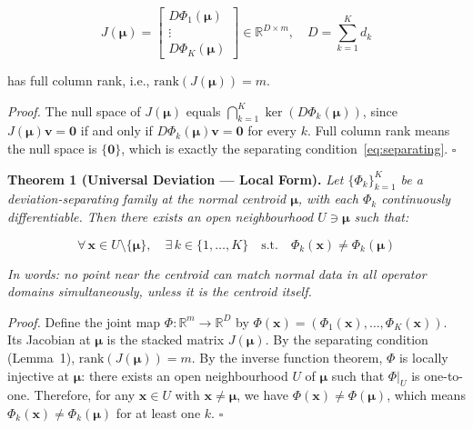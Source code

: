\documentclass[journal]{IEEEtran}
\newcommand{\R}{\mathbb{R}}
\begin{document}
\begin{equation}
J(\boldsymbol{\mu}) = \begin{bmatrix} D\Phi_1(\boldsymbol{\mu}) \\ \vdots \\ D\Phi_K(\boldsymbol{\mu}) \end{bmatrix} \in \R^{D \times m}, \quad D = \textstyle\sum_{k=1}^K d_k
\label{eq:stacked_jacobian}
\end{equation}

has full column rank, i.e., $\text{rank}(J(\boldsymbol{\mu})) = m$.

\textit{Proof.} The null space of $J(\boldsymbol{\mu})$ equals $\bigcap_{k=1}^K \ker(D\Phi_k(\boldsymbol{\mu}))$, since $J(\boldsymbol{\mu})\mathbf{v} = \mathbf{0}$ if and only if $D\Phi_k(\boldsymbol{\mu})\mathbf{v} = \mathbf{0}$ for every $k$. Full column rank means the null space is $\{\mathbf{0}\}$, which is exactly the separating condition~\eqref{eq:separating}. $\square$

\vspace{0.5em}

\textbf{Theorem 1 (Universal Deviation --- Local Form).} \textit{Let $\{\Phi_k\}_{k=1}^K$ be a deviation-separating family at the normal centroid $\boldsymbol{\mu}$, with each $\Phi_k$ continuously differentiable. Then there exists an open neighbourhood $U \ni \boldsymbol{\mu}$ such that:}

\begin{equation}
\forall\, \mathbf{x} \in U \setminus \{\boldsymbol{\mu}\},\quad \exists\, k \in \{1,\ldots,K\} \quad\text{s.t.}\quad \Phi_k(\mathbf{x}) \neq \Phi_k(\boldsymbol{\mu})
\label{eq:theorem_local}
\end{equation}

\textit{In words: no point near the centroid can match normal data in all operator domains simultaneously, unless it is the centroid itself.}

\textit{Proof.} Define the joint map $\Phi: \R^m \to \R^D$ by $\Phi(\mathbf{x}) = (\Phi_1(\mathbf{x}), \ldots, \Phi_K(\mathbf{x}))$. Its Jacobian at $\boldsymbol{\mu}$ is the stacked matrix $J(\boldsymbol{\mu})$. By the separating condition (Lemma~1), $\text{rank}(J(\boldsymbol{\mu})) = m$. By the inverse function theorem, $\Phi$ is locally injective at $\boldsymbol{\mu}$: there exists an open neighbourhood $U$ of $\boldsymbol{\mu}$ such that $\Phi|_U$ is one-to-one. Therefore, for any $\mathbf{x} \in U$ with $\mathbf{x} \neq \boldsymbol{\mu}$, we have $\Phi(\mathbf{x}) \neq \Phi(\boldsymbol{\mu})$, which means $\Phi_k(\mathbf{x}) \neq \Phi_k(\boldsymbol{\mu})$ for at least one $k$. $\square$
\end{document}
